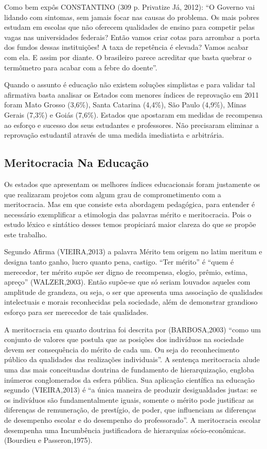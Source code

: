 \documentclass[
	article,			%
	11pt,				%
	oneside,			%
	a4paper,			%
	english,			%
	brazil,				%
	sumario=tradicional
	]{abntex2}
\begin{document}
Como bem expôs CONSTANTINO (309 p. Privatize Já, 2012): “O Governo vai lidando com sintomas, sem jamais focar nas causas do problema. Os mais pobres estudam em escolas que não oferecem qualidades de ensino para competir pelas vagas nas universidades federais? Então vamos criar cotas para arrombar a porta dos fundos dessas instituições! A taxa de repetência é elevada? Vamos acabar com ela. E assim por diante. O brasileiro parece acreditar que basta quebrar o termômetro para acabar com a febre do doente”. 

Quando o assunto é educação não existem soluções simplistas e para validar tal afirmativa basta analisar os Estados com menores índices de reprovação em 2011 foram Mato Grosso (3,6\%), Santa Catarina (4,4\%), São Paulo (4,9\%), Minas Gerais (7,3\%) e Goiás (7,6\%). Estados que apostaram em medidas de recompensa ao esforço e sucesso dos seus estudantes e professores.  Não precisaram eliminar a reprovação estudantil através de uma medida imediatista e arbitrária.


\subsection{Meritocracia Na Educação}
Os estados que apresentam os melhores índices educacionais foram justamente os que realizaram projetos com algum grau de comprometimento com a meritocracia.   Mas em que consiste esta abordagem pedagógica, para entender é necessário exemplificar a etimologia das palavras  mérito e meritocracia. Pois o estudo léxico e sintático desses temos propiciará maior clareza do que se propõe este trabalho.  

Segundo Afirma (VIEIRA,2013) a palavra Mérito tem origem no latim meritum e designa tanto ganho, lucro quanto pena, castigo. “Ter mérito” é “quem é merecedor, ter mérito supõe ser digno de recompensa, elogio, prêmio, estima, apreço” (WALZER,2003).  Então supõe-se que só seriam louvados aqueles com amplitude de grandeza, ou seja, o ser que apresenta uma associação de qualidades intelectuais e morais reconhecidas pela sociedade, além de demonstrar grandioso esforço para ser merecedor de tais qualidades.  

A meritocracia em quanto doutrina foi descrita por (BARBOSA,2003) “como um conjunto de valores que postula que as posições dos indivíduos na sociedade devem ser consequência do mérito de cada um. Ou seja do reconhecimento público da qualidades das realizações individuais”.  A sentença meritocracia alude uma das mais conceituadas doutrina de fundamento de hierarquização, engloba inúmeros conglomerados da esfera pública. Sua aplicação científica na educação segundo (VIEIRA,2013) é “a única maneira de produzir desigualdades justas: se os indivíduos são fundamentalmente iguais, somente o mérito pode justificar as diferenças de remuneração, de prestígio, de poder, que influenciam as diferenças de desempenho escolar e do desempenho do professorado”. A meritocracia escolar desempenha uma Incumbência justificadora de hierarquias sócio-econômicas. (Bourdieu e Passeron,1975). 
\end{document}
